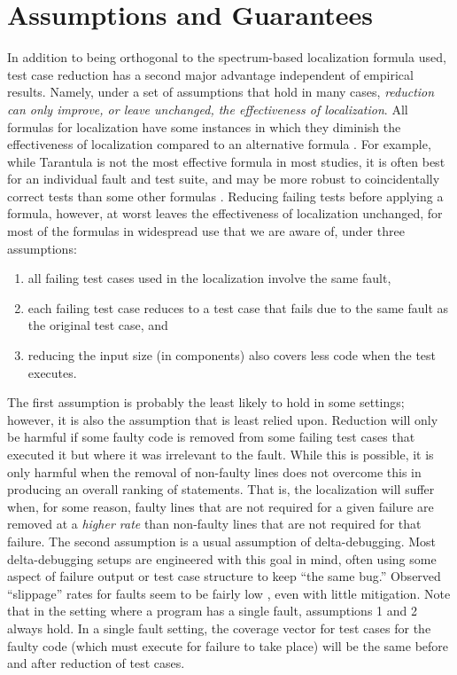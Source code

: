 \section{Assumptions and Guarantees}
\label{formal}

In addition to being orthogonal to the spectrum-based localization
formula used, test case reduction has a second major advantage
independent of empirical results.  Namely, under a set of assumptions
that hold in many cases, \emph{reduction can only improve, or leave
unchanged, the effectiveness of localization}.  All formulas for
localization have some instances in which they diminish the
effectiveness of localization compared to an alternative formula
\cite{yoo2014no}. For example, while Tarantula is not the most
effective formula in most studies, it is often best for an
individual fault and test suite, and may be more robust to
coincidentally correct tests than some other formulas \cite{CCT}.
Reducing failing tests before applying a formula, however, at worst
leaves the effectiveness of localization unchanged, for most of the
formulas in widespread use that we are aware of, under three
assumptions:

\begin{enumerate}
\item all failing test cases used in the localization involve the same
fault,
\item each failing test case reduces to a test case that fails due to the same fault as the original test case, and
\item reducing the input size (in components) also covers less code when the test executes.
\end{enumerate}

The first assumption is probably the least likely to hold in some
settings; however, it is also the assumption that is least relied
upon.  Reduction will only be harmful if some faulty code is removed
from some failing test cases that executed it but where it was
irrelevant to the fault.  While this is possible, it is only harmful
when the removal of non-faulty lines does not overcome this in
producing an overall ranking of statements.  That is, the localization
will suffer when, for some reason, faulty lines that are not required
for a given failure are removed at a \emph{higher rate} than non-faulty lines
that are not required for that failure.  The second assumption is a usual assumption of delta-debugging.  Most
delta-debugging setups are engineered with this goal in mind, often
using some aspect of failure output or test case structure to keep
``the same bug.''  Observed ``slippage'' rates for faults
seem to be fairly low \cite{PLDI13}, even with little mitigation.
Note that in the setting where a program has a single fault,
assumptions 1 and 2 always hold.  In a single fault setting, the
coverage vector for test cases for the faulty code (which must execute
for failure to take place) will be the same before and after reduction
of test cases.


